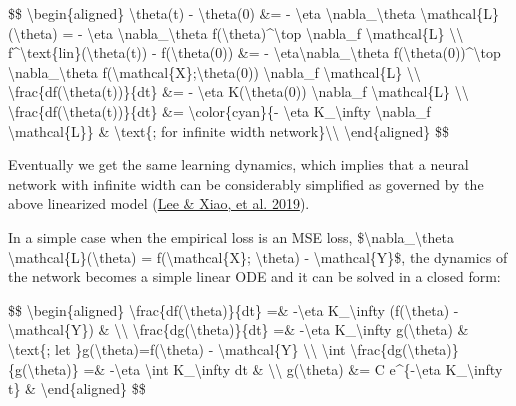 \$\$ \textbackslash begin\{aligned\} \textbackslash theta(t) - \textbackslash theta(0) \&= - \textbackslash eta \textbackslash nabla\_\textbackslash theta \textbackslash mathcal\{L\}(\textbackslash theta) = - \textbackslash eta \textbackslash nabla\_\textbackslash theta f(\textbackslash theta)\^{}\textbackslash top \textbackslash nabla\_f \textbackslash mathcal\{L\} \textbackslash\textbackslash{} f\^{}\textbackslash text\{lin\}(\textbackslash theta(t)) - f(\textbackslash theta(0)) \&= - \textbackslash eta\textbackslash nabla\_\textbackslash theta f(\textbackslash theta(0))\^{}\textbackslash top \textbackslash nabla\_\textbackslash theta f(\textbackslash mathcal\{X\};\textbackslash theta(0)) \textbackslash nabla\_f \textbackslash mathcal\{L\} \textbackslash\textbackslash{} \textbackslash frac\{df(\textbackslash theta(t))\}\{dt\} \&= - \textbackslash eta K(\textbackslash theta(0)) \textbackslash nabla\_f \textbackslash mathcal\{L\} \textbackslash\textbackslash{} \textbackslash frac\{df(\textbackslash theta(t))\}\{dt\} \&= \textbackslash color\{cyan\}\{- \textbackslash eta K\_\textbackslash infty \textbackslash nabla\_f \textbackslash mathcal\{L\}\} \& \textbackslash text\{; for infinite width network\}\textbackslash\textbackslash{} \textbackslash end\{aligned\} \$\$

Eventually we get the same learning dynamics, which implies that a neural network with infinite width can be considerably simplified as governed by the above linearized model (\href{https://arxiv.org/abs/1902.06720}{Lee \& Xiao, et al. 2019}).

In a simple case when the empirical loss is an MSE loss, \$\textbackslash nabla\_\textbackslash theta \textbackslash mathcal\{L\}(\textbackslash theta) = f(\textbackslash mathcal\{X\}; \textbackslash theta) - \textbackslash mathcal\{Y\}\$, the dynamics of the network becomes a simple linear ODE and it can be solved in a closed form:

\$\$ \textbackslash begin\{aligned\} \textbackslash frac\{df(\textbackslash theta)\}\{dt\} =\& -\textbackslash eta K\_\textbackslash infty (f(\textbackslash theta) - \textbackslash mathcal\{Y\}) \& \textbackslash\textbackslash{} \textbackslash frac\{dg(\textbackslash theta)\}\{dt\} =\& -\textbackslash eta K\_\textbackslash infty g(\textbackslash theta) \& \textbackslash text\{; let \}g(\textbackslash theta)=f(\textbackslash theta) - \textbackslash mathcal\{Y\} \textbackslash\textbackslash{} \textbackslash int \textbackslash frac\{dg(\textbackslash theta)\}\{g(\textbackslash theta)\} =\& -\textbackslash eta \textbackslash int K\_\textbackslash infty dt \& \textbackslash\textbackslash{} g(\textbackslash theta) \&= C e\^{}\{-\textbackslash eta K\_\textbackslash infty t\} \& \textbackslash end\{aligned\} \$\$

